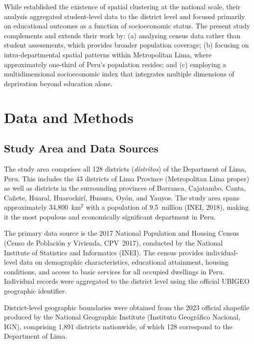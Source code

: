 \documentclass[12pt,a4paper,twoside]{article}
\begin{document}
While \citet{alonso2025segregacion} established the existence of spatial clustering
at the national scale, their analysis aggregated student-level data to the district
level and focused primarily on educational outcomes as a function of socioeconomic
status. The present study complements and extends their work by: (a) analysing
census data rather than student assessments, which provides broader population
coverage; (b) focusing on intra-departmental spatial patterns within Metropolitan
Lima, where approximately one-third of Peru's population resides; and (c) employing
a multidimensional socioeconomic index that integrates multiple dimensions of
deprivation beyond education alone.

\section{Data and Methods}

\subsection{Study Area and Data Sources}

The study area comprises all 128 districts (\textit{distritos}) of the Department of
Lima, Peru. This includes the 43 districts of Lima Province (Metropolitan Lima proper)
as well as districts in the surrounding provinces of Barranca, Cajatambo, Canta,
Cañete, Huaral, Huarochirí, Huaura, Oyón, and Yauyos. The study area spans
approximately 34,800~km$^2$ with a population of 9.5~million (INEI, 2018), making
it the most populous and economically significant department in Peru.

The primary data source is the 2017 National Population and Housing Census
(Censo de Población y Vivienda, CPV~2017), conducted by the National Institute of
Statistics and Informatics (INEI). The census provides individual-level data on
demographic characteristics, educational attainment, housing conditions, and access
to basic services for all occupied dwellings in Peru. Individual records were
aggregated to the district level using the official UBIGEO geographic identifier.

District-level geographic boundaries were obtained from the 2023 official shapefile
produced by the National Geographic Institute (Instituto Geográfico Nacional, IGN),
comprising 1,891 districts nationwide, of which 128 correspond to the Department of
Lima.
\end{document}
